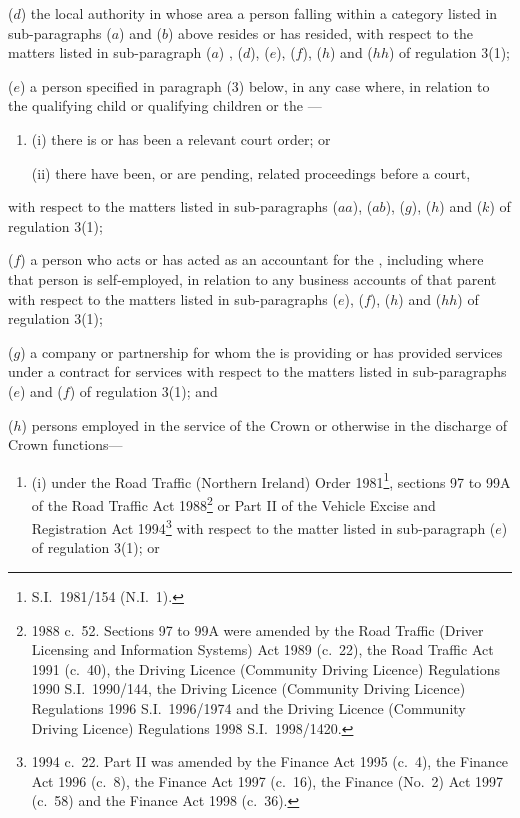 \documentclass[a4paper,12pt]{article}
\begin{document}
\begin{enumerate}
($d$) the local authority in whose area a person falling within a category listed in sub-paragraphs ($a$) and ($b$) above resides or has resided, with respect to the 
matters  %
listed in sub-paragraph ($a$)%
, ($d$), ($e$), ($f$), ($h$)  and ($hh$)  %
of regulation 3(1);

($e$) a person specified in paragraph (3) below, in any case where, in relation to the qualifying child or qualifying children or the —
\begin{enumerate}\item[]
(i) there is or has been a relevant court order; or

(ii) there have been, or are pending, related proceedings before a court,
\end{enumerate}
with respect to the matters listed in sub-paragraphs 
($aa$), ($ab$),  %
($g$), ($h$) and ($k$) of regulation 3(1);

($f$) a person who acts or has acted as an accountant for the , including where that person is self-employed, in relation to any business accounts of that parent with respect to the matters listed in sub-paragraphs ($e$), ($f$), ($h$)  and ($hh$)  of regulation 3(1);

($g$) a company or partnership for whom the  is providing or has provided services under a contract for services with respect to the matters listed in sub-paragraphs ($e$)  and ($f$)  of regulation 3(1); and

($h$) persons employed in the service of the Crown or otherwise in the discharge of Crown functions—
\begin{enumerate}\item[]
(i) under 
the Road Traffic (Northern Ireland) Order 1981\footnote{S.I.\ 1981/154 (N.I.\ 1).},  %
sections 97 to 99A of the Road Traffic Act 1988\footnote{1988 c.\ 52. Sections 97 to 99A were amended by the Road Traffic (Driver Licensing and Information Systems) Act 1989 (c.\ 22), the Road Traffic Act 1991 (c.\ 40), the Driving Licence (Community Driving Licence) Regulations 1990 S.I.\ 1990/144, the Driving Licence (Community Driving Licence) Regulations 1996 S.I.\ 1996/1974 and the Driving Licence (Community Driving Licence) Regulations 1998 S.I.\ 1998/1420.} or Part II of the Vehicle Excise and Registration Act 1994\footnote{1994 c.\ 22. Part II was amended by the Finance Act 1995 (c.\ 4), the Finance Act 1996 (c.\ 8), the Finance Act 1997 (c.\ 16), the Finance (No.\ 2) Act 1997 (c.\ 58) and the Finance Act 1998 (c.\ 36).} with respect to the matter listed in sub-paragraph ($e$)  of regulation 3(1); or


\end{enumerate}
\end{enumerate}
\end{document}
